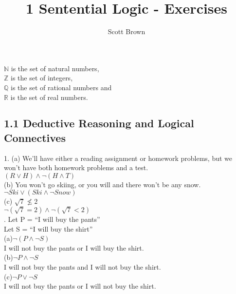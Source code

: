 \documentclass{article}
\begin{document}
\title{1 Sentential Logic - Exercises}
\author{Scott Brown}
\maketitle
$\mathbb{N}$ is the set of natural numbers,\\
$\mathbb{Z}$ is the set of integers,\\
$\mathbb{Q}$ is the set of rational numbers and\\
$\mathbb{R}$ is the set of real numbers.\\

\subsection*{1.1 Deductive Reasoning and Logical Connectives}
1. (a) We'll have either a reading assignment or homework problems, but we
won't have both homework problems and a test.\\
$(R \vee H) \wedge \neg(H \wedge T)$\\
(b) You won't go skiing, or you will and there won't be any snow.\\
$\neg Ski \vee (Ski \wedge \neg Snow)$\\
(c) $\sqrt 7 \not \le 2$\\
$\neg (\sqrt 7 = 2) \wedge \neg (\sqrt 7 < 2)$\\
. Let P = ``I will buy the pants''\\
   Let S = ``I will buy the shirt''\\
(a)$\neg(P \wedge \neg S)$\\
I will not buy the pants or I will buy the shirt.\\
(b)$\neg P \wedge \neg S$\\
I will not buy the pants and I will not buy the shirt.\\
(c)$\neg P \vee \neg S$\\
I will not buy the pants or I will not buy the shirt.\\
\end{document}
